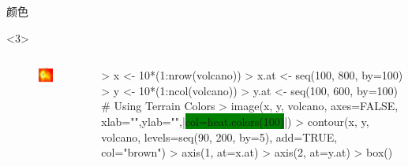 \documentclass{beamerthemeMono}
\begin{document}
\begin{frame}[t,fragile]{\subsecname}{颜色}
\begin{overlayarea}{\textwidth}{\textheight}
\begin{onlyenv}<3>
  \begin{columns}
    \begin{column}{.4\textwidth}
\centering
\begin{figure}
  \includegraphics[width=\columnwidth]{heat_colors.png}
\end{figure}
    \end{column}

    \begin{column}{.6\textwidth}
\centering
\begin{rcode}
> x <- 10*(1:nrow(volcano))
> x.at <- seq(100, 800, by=100)
> y <- 10*(1:ncol(volcano))
> y.at <- seq(100, 600, by=100)
# Using Terrain Colors 
> image(x, y, volcano, axes=FALSE, xlab="",ylab="",|\colorbox{green}{col=heat.colors(100)}|)
> contour(x, y, volcano, levels=seq(90, 200, by=5), add=TRUE, col="brown")
> axis(1, at=x.at)
> axis(2, at=y.at)
> box()
\end{rcode}
    \end{column}
  \end{columns}
\end{onlyenv}


\end{overlayarea}
\end{frame}
\end{document}
